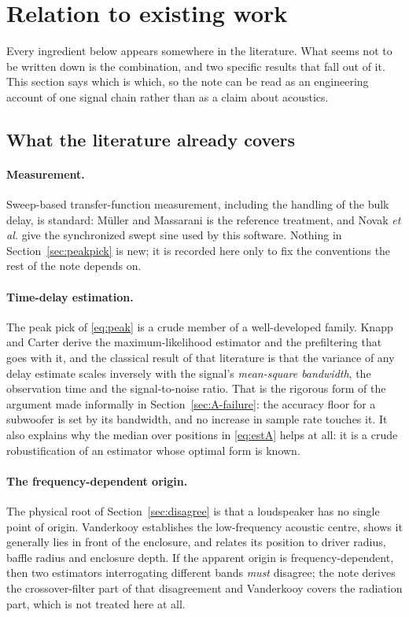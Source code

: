 \documentclass[11pt,a4paper]{article}
\begin{document}
\section{Relation to existing work}
\label{sec:litt}

Every ingredient below appears somewhere in the literature. What seems not to be
written down is the combination, and two specific results that fall out of it.
This section says which is which, so the note can be read as an engineering
account of one signal chain rather than as a claim about acoustics.

\subsection{What the literature already covers}

\paragraph{Measurement.} Sweep-based transfer-function measurement, including
the handling of the bulk delay, is standard: M\"uller and Massarani
\cite{Muller2001} is the reference treatment, and Novak \emph{et al.}
\cite{Novak2015} give the synchronized swept sine used by this software. Nothing
in Section~\ref{sec:peakpick} is new; it is recorded here only to fix the
conventions the rest of the note depends on.

\paragraph{Time-delay estimation.} The peak pick of \eqref{eq:peak} is a crude
member of a well-developed family. Knapp and Carter \cite{Knapp1976} derive the
maximum-likelihood estimator and the prefiltering that goes with it, and the
classical result of that literature is that the variance of any delay estimate
scales inversely with the signal's \emph{mean-square bandwidth}, the observation
time and the signal-to-noise ratio. That is the rigorous form of the argument
made informally in Section~\ref{sec:A-failure}: the accuracy floor for a
subwoofer is set by its bandwidth, and no increase in sample rate touches it. It
also explains why the median over positions in \eqref{eq:estA} helps at all:
it is a crude robustification of an estimator whose optimal form is known.

\paragraph{The frequency-dependent origin.} The physical root of
Section~\ref{sec:disagree} is that a loudspeaker has no single point of origin.
Vanderkooy \cite{Vanderkooy2006,Vanderkooy2010} establishes the low-frequency
acoustic centre, shows it generally lies in front of the enclosure, and relates
its position to driver radius, baffle radius and enclosure depth. If the
apparent origin is frequency-dependent, then two estimators interrogating
different bands \emph{must} disagree; the note derives the crossover-filter part
of that disagreement and Vanderkooy covers the radiation part, which is not
treated here at all.
\end{document}
